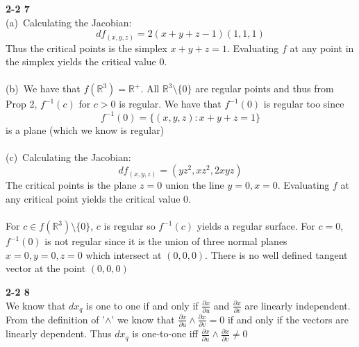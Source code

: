 \documentclass[12pt]{article}
\newenvironment{ques}[1]{\textbf{#1}\vspace{1 mm}\\ }{\bigskip}
\theoremstyle{definition}
\newcommand{\R}{\mathbb R}
\begin{document}
\begin{ques}{2-2 7}
	(a)\ Calculating the Jacobian:
	$$
	df_{(x,y,z)} = 2(x + y + z - 1)(1,1,1)
	$$
	Thus the critical points is the simplex $x + y + z = 1$. Evaluating $f$ at
	any point in the simplex yields the critical value $0$.\\
	\\
	(b)\ We have that $f(\R^3) = \R^+$. All $\R^3 \setminus \{0\}$ are regular
	points and thus from Prop 2, $f^{-1}(c)$ for $c > 0$ is regular. We have
	that $f^{-1}(0)$ is regular too since
	$$f^{-1}(0) = \{(x,y,z): x + y + z = 1\}$$
	is a plane (which we know is regular)
	\\
	\\
	(c)\ Calculating the Jacobian:
	$$
	df_{(x,y,z)} = (yz^2, xz^2, 2xyz)
	$$
	The critical points is the plane $z = 0$ union the line $y = 0, x = 0$.
	Evaluating $f$ at any critical point yields the critical value $0$.\\
	\\
	For $c \in f(\R^3) \setminus \{0\}$, $c$ is regular so $f^{-1}(c)$ yields a
	regular surface. For $c = 0$, $f^{-1}(0)$ is not regular since it is the
	union of three normal planes $x = 0, y = 0, z = 0$ which intersect at
	$(0,0,0)$. There is no well defined tangent vector at the point $(0,0,0)$

\end{ques}

\begin{ques}{2-2 8}
	We know that $dx_q$ is one to one if and only if $\frac{\partial
	x}{\partial u}$ and $\frac{\partial x}{\partial v}$ are linearly
	independent. From the definition of '$\wedge$' we know that $\frac{\partial
	x}{\partial u} \wedge \frac{\partial x}{\partial v} = 0$ if and only if the
	vectors are linearly dependent. Thus $dx_q$ is one-to-one iff $\frac{\partial
	x}{\partial u} \wedge \frac{\partial x}{\partial v} \neq 0$
\end{ques}
\end{document}
